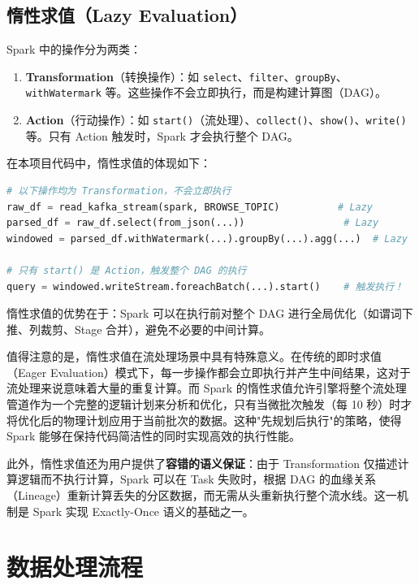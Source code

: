 \documentclass[12pt,a4paper]{article}
\begin{document}
\subsection{惰性求值（Lazy Evaluation）}

Spark 中的操作分为两类：

\begin{enumerate}    \item \textbf{Transformation}（转换操作）：如 \texttt{select}、\texttt{filter}、\texttt{groupBy}、\texttt{withWatermark} 等。这些操作不会立即执行，而是构建计算图（DAG）。
    \item \textbf{Action}（行动操作）：如 \texttt{start()}（流处理）、\texttt{collect()}、\texttt{show()}、\texttt{write()} 等。只有 Action 触发时，Spark 才会执行整个 DAG。
\end{enumerate}

在本项目代码中，惰性求值的体现如下：

\begin{lstlisting}[language=Python, caption={惰性求值示例（hot\_products.py）}]
# 以下操作均为 Transformation，不会立即执行
raw_df = read_kafka_stream(spark, BROWSE_TOPIC)          # Lazy
parsed_df = raw_df.select(from_json(...))                 # Lazy
windowed = parsed_df.withWatermark(...).groupBy(...).agg(...)  # Lazy

# 只有 start() 是 Action，触发整个 DAG 的执行
query = windowed.writeStream.foreachBatch(...).start()    # 触发执行！
\end{lstlisting}

惰性求值的优势在于：Spark 可以在执行前对整个 DAG 进行全局优化（如谓词下推、列裁剪、Stage 合并），避免不必要的中间计算。

值得注意的是，惰性求值在流处理场景中具有特殊意义。在传统的即时求值（Eager Evaluation）模式下，每一步操作都会立即执行并产生中间结果，这对于流处理来说意味着大量的重复计算。而 Spark 的惰性求值允许引擎将整个流处理管道作为一个完整的逻辑计划来分析和优化，只有当微批次触发（每 10 秒）时才将优化后的物理计划应用于当前批次的数据。这种"先规划后执行"的策略，使得 Spark 能够在保持代码简洁性的同时实现高效的执行性能。

此外，惰性求值还为用户提供了\textbf{容错的语义保证}：由于 Transformation 仅描述计算逻辑而不执行计算，Spark 可以在 Task 失败时，根据 DAG 的血缘关系（Lineage）重新计算丢失的分区数据，而无需从头重新执行整个流水线。这一机制是 Spark 实现 Exactly-Once 语义的基础之一。

\section{数据处理流程}
\end{document}
